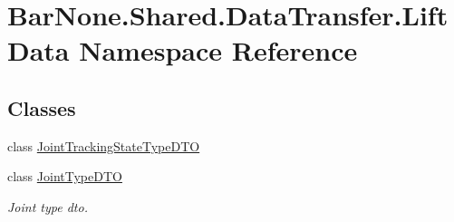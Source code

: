 \hypertarget{namespace_bar_none_1_1_shared_1_1_data_transfer_1_1_lift_data}{}\section{Bar\+None.\+Shared.\+Data\+Transfer.\+Lift\+Data Namespace Reference}
\label{namespace_bar_none_1_1_shared_1_1_data_transfer_1_1_lift_data}
\subsection*{Classes}
\begin{DoxyCompactItemize}
\item 
class \mbox{\hyperlink{class_bar_none_1_1_shared_1_1_data_transfer_1_1_lift_data_1_1_joint_tracking_state_type_d_t_o}{Joint\+Tracking\+State\+Type\+D\+TO}}
\item 
class \mbox{\hyperlink{class_bar_none_1_1_shared_1_1_data_transfer_1_1_lift_data_1_1_joint_type_d_t_o}{Joint\+Type\+D\+TO}}
\begin{DoxyCompactList}\small\item\em Joint type dto. \end{DoxyCompactList}\end{DoxyCompactItemize}
